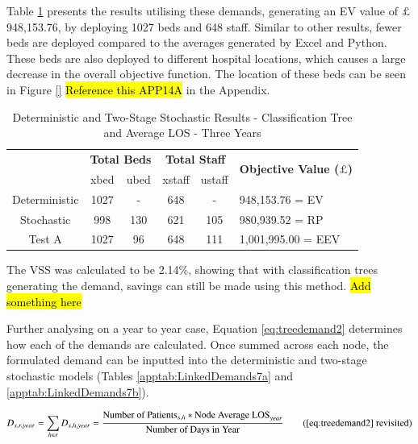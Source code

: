 \documentclass[../thesis.tex]{subfiles}
\begin{document}
Table \ref{tab:Results6} presents the results utilising these demands, generating an EV value of $\pounds$ 948,153.76, by deploying 1027 beds and 648 staff. Similar to other results, fewer beds are deployed compared to the averages generated by Excel and Python. These beds are also deployed to different hospital locations, which causes a large decrease in the overall objective function. The location of these beds can be seen in Figure \ref{} \hl{Reference this APP14A} in the Appendix.


\begin{table}[h!]
    \centering
    \begin{tabular}{cccccl}\toprule
 & \multicolumn{2}{l}{\textbf{Total Beds}} & \multicolumn{2}{c}{\textbf{Total Staff}} & \multirow{2}{*}{\textbf{Objective Value ($\pounds$)}}\\ \cmidrule(lr){2-3} \cmidrule(lr){4-5}
 & xbed           & ubed          & xstaff         & ustaff         \\ \midrule
    Deterministic      & 1027 & - & 648 & - & 948,153.76 = EV \\ \midrule
    Stochastic &998& 130& 621 & 105&  980,939.52 = RP \\ \midrule
    Test A & 1027 & 96 & 648 & 111 & 1,001,995.00 = EEV \\\bottomrule
    \end{tabular}
    \caption{Deterministic and Two-Stage Stochastic Results - Classification Tree and Average LOS - Three Years}
    \label{tab:Results6}
\end{table}

The VSS was calculated to be 2.14\%, showing that with classification trees generating the demand, savings can still be made using this method. \hl{Add something here}

Further analysing on a year to year case, Equation \eqref{eq:treedemand2} determines how each of the demands are calculated. Once summed across each node, the formulated demand can be inputted into the deterministic and two-stage stochastic models (Tables \ref{apptab:LinkedDemands7a} and \ref{apptab:LinkedDemands7b}).

\begin{equation}
        D_{s,r,year} = \sum\limits_{h \in r} D_{s,h,year} = \frac{\text{Number of Patients}_{s,h}* {\text{Node Average LOS}}_{year}}{\text{Number of Days in Year}} \tag{\ref{eq:treedemand2} revisited}
\end{equation}
\end{document}
